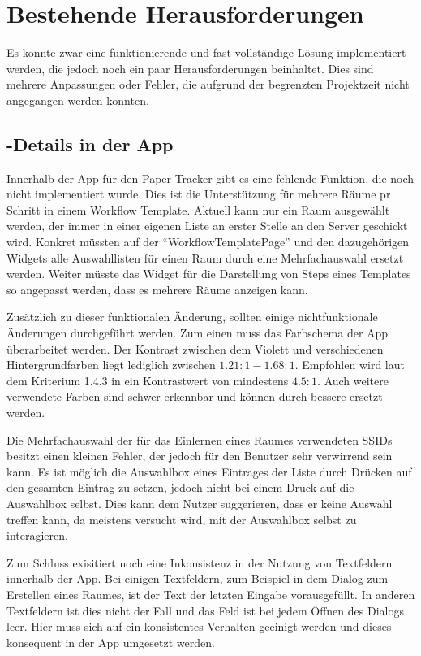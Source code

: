 \section{Bestehende Herausforderungen}

Es konnte zwar eine funktionierende und fast vollständige Lösung implementiert werden, die jedoch noch ein paar
Herausforderungen beinhaltet.
Dies sind mehrere Anpassungen oder Fehler, die aufgrund der begrenzten Projektzeit nicht angegangen werden konnten.

\subsection{-Details in der App} \label{sec:impl-challenges-ui}

Innerhalb der App für den Paper-Tracker gibt es eine fehlende Funktion, die noch nicht implementiert wurde.
Dies ist die Unterstützung für mehrere Räume pr Schritt in einem Workflow Template.
Aktuell kann nur ein Raum ausgewählt werden, der immer in einer eigenen Liste an erster Stelle an den Server geschickt wird.
Konkret müssten auf der \enquote{WorkflowTemplatePage} und den dazugehörigen Widgets alle Auswahllisten für einen Raum durch
eine Mehrfachauswahl ersetzt werden.
Weiter müsste das Widget für die Darstellung von Steps eines Templates so angepasst werden, dass es
mehrere Räume anzeigen kann.

Zusätzlich zu dieser funktionalen Änderung, sollten einige nichtfunktionale Änderungen durchgeführt werden.
Zum einen muss das Farbschema der App überarbeitet werden.
Der Kontrast zwischen dem Violett und verschiedenen Hintergrundfarben liegt lediglich zwischen $1.21:1 - 1.68:1$.
Empfohlen wird laut dem Kriterium 1.4.3 in \cite{W3C2018} ein Kontrastwert von mindestens $4.5:1$.
Auch weitere verwendete Farben sind schwer erkennbar und können durch bessere ersetzt werden.

Die Mehrfachauswahl der für das Einlernen eines Raumes verwendeten \gls{SSID}s besitzt einen kleinen Fehler, der jedoch
für den Benutzer sehr verwirrend sein kann.
Es ist möglich die Auswahlbox eines Eintrages der Liste durch Drücken auf den gesamten Eintrag zu setzen, jedoch nicht
bei einem Druck auf die Auswahlbox selbst.
Dies kann dem Nutzer suggerieren, dass er keine Auswahl treffen kann, da meistens versucht wird, mit der Auswahlbox selbst
zu interagieren.

Zum Schluss exisitiert noch eine Inkonsistenz in der Nutzung von Textfeldern innerhalb der App.
Bei einigen Textfeldern, zum Beispiel in dem Dialog zum Erstellen eines Raumes, ist der Text der letzten Eingabe vorausgefüllt.
In anderen Textfeldern ist dies nicht der Fall und das Feld ist bei jedem Öffnen des Dialogs leer.
Hier muss sich auf ein konsistentes Verhalten geeinigt werden und dieses konsequent in der App umgesetzt werden.

